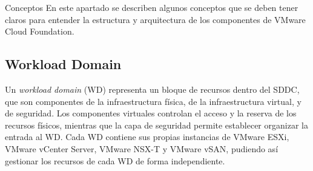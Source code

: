 \begin{section}{Conceptos}
En este apartado se describen algunos conceptos que se deben tener claros para entender la estructura y arquitectura de los componentes de VMware Cloud Foundation.



\subsection{Workload Domain}
Un \textit{workload domain} (WD) representa un bloque de recursos dentro del SDDC, que son componentes de la infraestructura física, de la infraestructura virtual, y de seguridad. Los componentes virtuales controlan el acceso y la reserva de los recursos físicos, mientras que la capa de seguridad permite establecer organizar la entrada al WD. Cada WD contiene sus propias instancias de VMware ESXi, VMware vCenter Server, VMware NSX-T y VMware vSAN, pudiendo así gestionar los recursos de cada WD de forma independiente.


\end{section}
